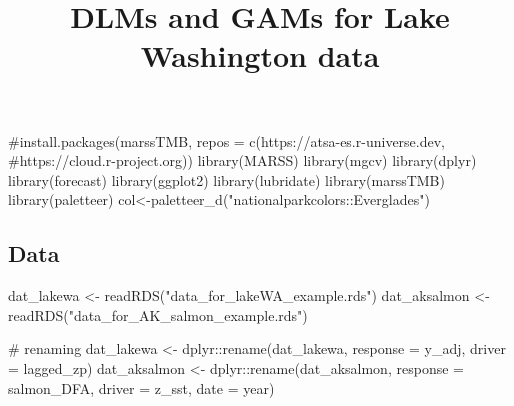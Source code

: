 \documentclass[
  letterpaper,
  DIV=11,
  numbers=noendperiod]{scrartcl}
\title{DLMs and GAMs for Lake Washington data}
\author{}
\date{}
\newenvironment{Shaded}{\begin{snugshade}}{\end{snugshade}}
\newcommand{\AttributeTok}[1]{\textcolor[rgb]{0.40,0.45,0.13}{#1}}
\newcommand{\CommentTok}[1]{\textcolor[rgb]{0.37,0.37,0.37}{#1}}
\newcommand{\FunctionTok}[1]{\textcolor[rgb]{0.28,0.35,0.67}{#1}}
\newcommand{\NormalTok}[1]{\textcolor[rgb]{0.00,0.23,0.31}{#1}}
\newcommand{\OtherTok}[1]{\textcolor[rgb]{0.00,0.23,0.31}{#1}}
\newcommand{\SpecialCharTok}[1]{\textcolor[rgb]{0.37,0.37,0.37}{#1}}
\newcommand{\StringTok}[1]{\textcolor[rgb]{0.13,0.47,0.30}{#1}}
\begin{document}
\maketitle

\begin{Shaded}
\begin{Highlighting}[]
\CommentTok{\#install.packages(\textquotesingle{}marssTMB\textquotesingle{}, repos = c(\textquotesingle{}https://atsa{-}es.r{-}universe.dev\textquotesingle{}, \#\textquotesingle{}https://cloud.r{-}project.org\textquotesingle{}))}
\FunctionTok{library}\NormalTok{(MARSS)}
\FunctionTok{library}\NormalTok{(mgcv)}
\FunctionTok{library}\NormalTok{(dplyr)}
\FunctionTok{library}\NormalTok{(forecast)}
\FunctionTok{library}\NormalTok{(ggplot2)}
\FunctionTok{library}\NormalTok{(lubridate)}
\FunctionTok{library}\NormalTok{(marssTMB)}
\FunctionTok{library}\NormalTok{(paletteer)}
\NormalTok{col}\OtherTok{\textless{}{-}}\FunctionTok{paletteer\_d}\NormalTok{(}\StringTok{"nationalparkcolors::Everglades"}\NormalTok{)}
\end{Highlighting}
\end{Shaded}

\subsection{Data}\label{data}

\begin{Shaded}
\begin{Highlighting}[]
\NormalTok{dat\_lakewa }\OtherTok{\textless{}{-}} \FunctionTok{readRDS}\NormalTok{(}\StringTok{"data\_for\_lakeWA\_example.rds"}\NormalTok{)}
\NormalTok{dat\_aksalmon }\OtherTok{\textless{}{-}} \FunctionTok{readRDS}\NormalTok{(}\StringTok{"data\_for\_AK\_salmon\_example.rds"}\NormalTok{)}

\CommentTok{\# renaming}
\NormalTok{dat\_lakewa }\OtherTok{\textless{}{-}}\NormalTok{ dplyr}\SpecialCharTok{::}\FunctionTok{rename}\NormalTok{(dat\_lakewa, }
                            \AttributeTok{response =}\NormalTok{ y\_adj,}
                            \AttributeTok{driver =}\NormalTok{ lagged\_zp)}
\NormalTok{dat\_aksalmon }\OtherTok{\textless{}{-}}\NormalTok{ dplyr}\SpecialCharTok{::}\FunctionTok{rename}\NormalTok{(dat\_aksalmon,}
                              \AttributeTok{response =}\NormalTok{ salmon\_DFA,}
                              \AttributeTok{driver =}\NormalTok{ z\_sst, }
                              \AttributeTok{date =}\NormalTok{ year)}
\end{Highlighting}
\end{Shaded}
\end{document}
